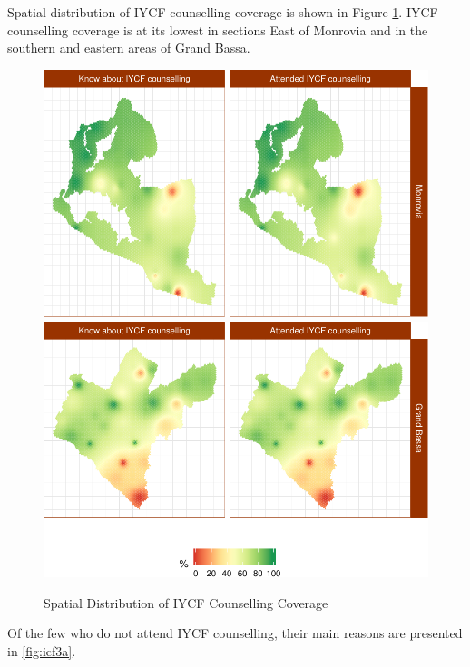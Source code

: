 \documentclass[12pt,a4paper]{article}
\theoremstyle{definition}
\theoremstyle{definition}
\theoremstyle{definition}
\theoremstyle{remark}
\begin{document}
Spatial distribution of IYCF counselling coverage is shown in Figure
\ref{fig:icfMap}. IYCF counselling coverage is at its lowest in sections
East of Monrovia and in the southern and eastern areas of Grand Bassa.

\begin{figure}[H]

{\centering \includegraphics{liberiaCoverageReport_files/figure-latex/icfMap-1} \includegraphics{liberiaCoverageReport_files/figure-latex/icfMap-2} 

}

\caption{Spatial Distribution of IYCF Counselling Coverage}\label{fig:icfMap}
\end{figure}

Of the few who do not attend IYCF counselling, their main reasons are
presented in \ref{fig:icf3a}.
\end{document}

